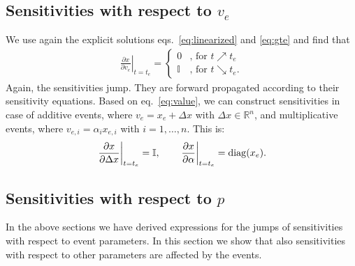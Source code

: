 \documentclass[journal, a4paper]{IEEEtran}
\begin{document}
\subsection{Sensitivities with respect to $v_e$}

We use again the explicit solutions eqs.~\eqref{eq:linearized} and \eqref{eq:gte} and find that
\begin{align}
    \left.\frac{\partial x}{\partial v_e}\right|_{t = t_e} =
    \left\{
    \begin{array}{ll}
    0     & \textrm{, for } t\nearrow t_e \\
    \mathbb I     & \textrm{, for }t \searrow t_e.
    \end{array}
    \right.
    \label{eq:value}
\end{align}
Again, the sensitivities jump. They are forward propagated according to their sensitivity equations. Based on eq.~\eqref{eq:value}, we can construct sensitivities in case of additive events, where $v_e = x_e + \Delta x$ with $\Delta x \in \mathbb R^n$, and multiplicative events, where $v_{e, i} = \alpha_i x_{e, i}$ with $i = 1, \dots, n$. This is:
\begin{align}
    \left.\frac{\partial x}{\partial \Delta x}\right|_{t = t_e} = \mathbb I, \qquad \left.\frac{\partial x}{\partial \alpha}\right|_{t = t_e} = {\rm diag}(x_e).
\end{align}

\subsection{Sensitivities with respect to $p$}


In the above sections we have derived expressions for the jumps of sensitivities with respect to event parameters. In this section we show that also sensitivities with respect to other parameters are affected by the events.
\end{document}

